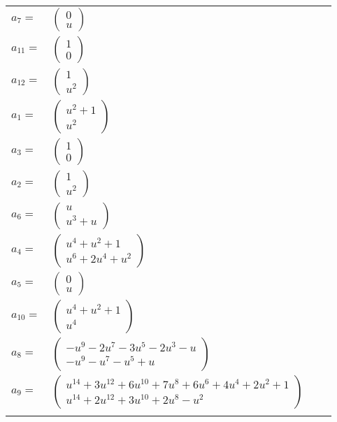 \documentclass[1p]{elsarticle_modified}
\theoremstyle{definition}
\begin{document}
\begin{tabular}{m{7pt} m{180pt} m{7pt} m{180pt} }
\flushright $a_{7}=$&$\begin{pmatrix}0\\u\end{pmatrix}$ \\
\flushright $a_{11}=$&$\begin{pmatrix}1\\0\end{pmatrix}$ \\
\flushright $a_{12}=$&$\begin{pmatrix}1\\u^2\end{pmatrix}$ \\
\flushright $a_{1}=$&$\begin{pmatrix}u^2+1\\u^2\end{pmatrix}$ \\
\flushright $a_{3}=$&$\begin{pmatrix}1\\0\end{pmatrix}$ \\
\flushright $a_{2}=$&$\begin{pmatrix}1\\u^2\end{pmatrix}$ \\
\flushright $a_{6}=$&$\begin{pmatrix}u\\u^3+u\end{pmatrix}$ \\
\flushright $a_{4}=$&$\begin{pmatrix}u^4+u^2+1\\u^6+2 u^4+u^2\end{pmatrix}$ \\
\flushright $a_{5}=$&$\begin{pmatrix}0\\u\end{pmatrix}$ \\
\flushright $a_{10}=$&$\begin{pmatrix}u^4+u^2+1\\u^4\end{pmatrix}$ \\
\flushright $a_{8}=$&$\begin{pmatrix}- u^9-2 u^7-3 u^5-2 u^3- u\\- u^9- u^7- u^5+u\end{pmatrix}$ \\
\flushright $a_{9}=$&$\begin{pmatrix}u^{14}+3 u^{12}+6 u^{10}+7 u^8+6 u^6+4 u^4+2 u^2+1\\u^{14}+2 u^{12}+3 u^{10}+2 u^8- u^2\end{pmatrix}$\\&\end{tabular}
\end{document}
